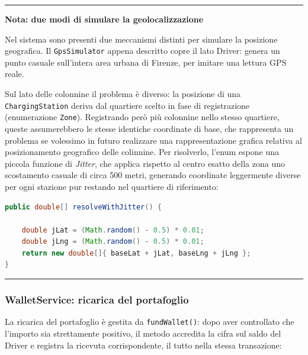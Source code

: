\vspace{0.6cm}
\hrule
\vspace{0.3cm}
\noindent\textbf{Nota: due modi di simulare la geolocalizzazione}
\vspace{0.3cm}

Nel sistema sono presenti due meccanismi distinti per simulare la posizione geografica. Il \texttt{GpsSimulator} appena descritto copre il lato Driver: genera un punto casuale sull'intera area urbana di Firenze, per imitare una lettura GPS reale.

Sul lato delle colonnine il problema è diverso: la posizione di una \texttt{ChargingStation} deriva dal quartiere scelto in fase di registrazione (enumerazione \texttt{Zone}). Registrando però più colonnine nello stesso quartiere, queste assumerebbero le stesse identiche coordinate di base, che rappresenta un problema se volessimo in futuro realizzare una rappresentazione grafica relativa al posizionamento geografico delle colinnine. Per risolverlo, l'enum espone una piccola funzione di \textit{Jitter}, che applica rispetto al centro esatto della zona uno scostamento casuale di circa 500 metri, generando coordinate leggermente diverse per ogni stazione pur restando nel quartiere di riferimento:

\vspace{0.3cm}
\noindent\begin{minipage}{\linewidth}
\begin{lstlisting}[language=Java, caption={Distribuzione geografica delle colonnine con jitter}]
public double[] resolveWithJitter() {

    double jLat = (Math.random() - 0.5) * 0.01;
    double jLng = (Math.random() - 0.5) * 0.01;
    return new double[]{ baseLat + jLat, baseLng + jLng };
}
\end{lstlisting}
\end{minipage}
\vspace{0.3cm}
\hrule
\vspace{0.6cm}

\subsubsection*{WalletService: ricarica del portafoglio}

La ricarica del portafoglio è gestita da \texttt{fundWallet()}: dopo aver controllato che l'importo sia strettamente positivo, il metodo accredita la cifra sul saldo del Driver e registra la ricevuta corrispondente, il tutto nella stessa transazione:

